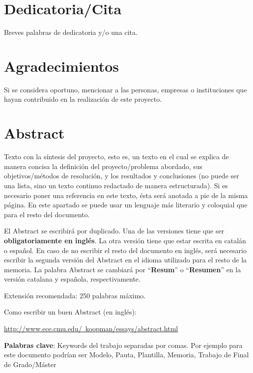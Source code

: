 \chapter*{Dedicatoria/Cita}

Breves palabras de dedicatoria y/o una cita.

\chapter*{Agradecimientos}

Si se considera oportuno, mencionar a las personas, empresas o instituciones que hayan contribuido en la realización de este proyecto.

\chapter*{Abstract}

\onehalfspacing

Texto con la síntesis del proyecto, esto es, un texto en el cual se explica de manera concisa la definición del proyecto/problema abordado, sus objetivos/métodos de resolución, y los resultados y conclusiones (no puede ser una lista, sino un texto continuo redactado de manera estructurada). Si es necesario poner una referencia en este texto, ésta será anotada a pie de la misma página. En este apartado se puede usar un lenguaje más literario y coloquial que para el resto del documento.

El Abstract se escribirá por duplicado. Una de las versiones tiene que ser \textbf{obligatoriamente en inglés}. La otra versión tiene que estar escrita en catalán o español. En caso de no escribir el resto del documento en inglés, será necesario escribir la segunda versión del Abstract en el idioma utilizado para el resto de la memoria. La palabra Abstract se cambiará por ``\textbf{Resum}'' o ``\textbf{Resumen}'' en la versión catalana y española, respectivamente. 

Extensión recomendada: 250 palabras máximo.

Como escribir un buen Abstract (en inglés):

\href{http://www.ece.cmu.edu/~koopman/essays/abstract.html}{http://www.ece.cmu.edu/~koopman/essays/abstract.html}

\vspace{1.5cm}

\textbf{Palabras clave}: Keywords del trabajo separadas por comas. Por ejemplo para este documento podrían ser Modelo, Pauta, Plantilla, Memoria, Trabajo de Final de Grado/Máster